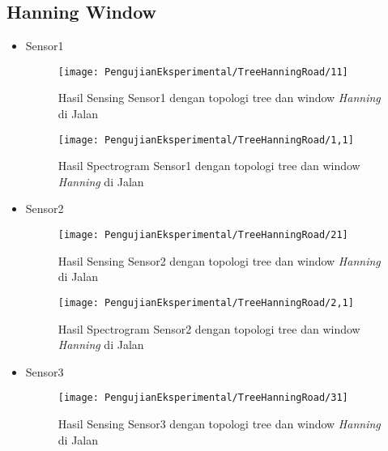 \subsection{Hanning Window}
\begin{itemize}
\item Sensor1
\begin{figure}[H]
	\centering
	\texttt{[image: PengujianEksperimental/TreeHanningRoad/11]}
	\caption[Hasil Sensing Sensor1 dengan topologi tree dan window {\it Hanning} di Jalan]{Hasil Sensing Sensor1 dengan topologi tree dan window {\it Hanning} di Jalan} 
	\label{fig:hasilJalanTreeHann11}
\end{figure}

\begin{figure}[H]
	\centering
	\texttt{[image: PengujianEksperimental/TreeHanningRoad/1,1]}
	\caption[Hasil Spectrogram Sensor1 dengan topologi tree dan window {\it Hanning} di Jalan]{Hasil Spectrogram Sensor1 dengan topologi tree dan window {\it Hanning} di Jalan} 
	\label{fig:hasilJalanTreeHann1,1}
\end{figure}

\item Sensor2
\begin{figure}[H]
	\centering
	\texttt{[image: PengujianEksperimental/TreeHanningRoad/21]}
	\caption[Hasil Sensing Sensor2 dengan topologi tree dan window {\it Hanning} di Jalan]{Hasil Sensing Sensor2 dengan topologi tree dan window {\it Hanning} di Jalan} 
	\label{fig:hasilJalanTreeHann21}
\end{figure}

\begin{figure}[H]
	\centering
	\texttt{[image: PengujianEksperimental/TreeHanningRoad/2,1]}
	\caption[Hasil Spectrogram Sensor2 dengan topologi tree dan window {\it Hanning} di Jalan]{Hasil Spectrogram Sensor2 dengan topologi tree dan window {\it Hanning} di Jalan} 
	\label{fig:hasilJalanTreeHann2,1}
\end{figure}

\item Sensor3
\begin{figure}[H]
	\centering
	\texttt{[image: PengujianEksperimental/TreeHanningRoad/31]}
	\caption[Hasil Sensing Sensor3 dengan topologi tree dan window {\it Hanning} di Jalan]{Hasil Sensing Sensor3 dengan topologi tree dan window {\it Hanning} di Jalan} 
	\label{fig:hasilJalanTreeHann31}
\end{figure}


\end{itemize}
